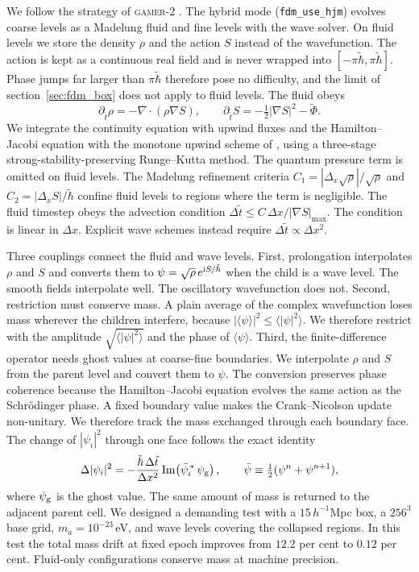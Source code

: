 \documentclass[11pt,a4paper]{article}
\newcommand{\code}[1]{\texttt{#1}}
\begin{document}
We follow the strategy of \textsc{gamer}-2
\citep{Kunkel2024,Chan2025}. The hybrid mode
(\code{fdm\_use\_hjm}) evolves coarse levels as a Madelung fluid
and fine levels with the wave solver. On fluid levels we store the
density $\rho$ and the action $S$ instead of the wavefunction. The
action is kept as a continuous real field and is never wrapped
into $[-\pi\tilde\hbar,\pi\tilde\hbar]$. Phase jumps far larger
than $\pi\tilde\hbar$ therefore pose no difficulty, and the limit
of section~\ref{sec:fdm_box} does not apply to fluid levels. The
fluid obeys
\begin{equation}
\partial_{\tilde t}\rho = -\nabla\!\cdot\!(\rho\nabla S),
\qquad
\partial_{\tilde t}S = -\tfrac12|\nabla S|^2 - \tilde\Phi.
\end{equation}
We integrate the continuity equation with upwind fluxes and the
Hamilton--Jacobi equation with the monotone upwind scheme of
\citet{OsherSethian1988}, using a three-stage
strong-stability-preserving Runge--Kutta method. The quantum
pressure term is omitted on fluid levels. The Madelung refinement
criteria $C_1=|\Delta_x\sqrt\rho|/\sqrt\rho$ and
$C_2=|\Delta_x S|/\tilde\hbar$ confine fluid levels to regions
where the term is negligible. The fluid timestep obeys the
advection condition
$\Delta\tilde t\le C\,\Delta x/|\nabla S|_{\max}$. The condition
is linear in $\Delta x$. Explicit wave schemes instead require
$\Delta\tilde t\propto\Delta x^2$.

Three couplings connect the fluid and wave levels. First,
prolongation interpolates $\rho$ and $S$ and converts them to
$\psi=\sqrt\rho\,e^{{\rm i}S/\tilde\hbar}$ when the child is a
wave level. The smooth fields interpolate well. The oscillatory
wavefunction does not. Second, restriction must conserve mass. A
plain average of the complex wavefunction loses mass wherever the
children interfere, because
$|\langle\psi\rangle|^2\le\langle|\psi|^2\rangle$. We therefore
restrict with the amplitude $\sqrt{\langle|\psi|^2\rangle}$ and
the phase of $\langle\psi\rangle$. Third, the finite-difference
operator needs ghost values at coarse-fine boundaries. We
interpolate $\rho$ and $S$ from the parent level and convert them
to $\psi$. The conversion preserves phase coherence because the
Hamilton--Jacobi equation evolves the same action as the
Schr\"odinger phase. A fixed boundary value makes the
Crank--Nicolson update non-unitary. We therefore track the mass
exchanged through each boundary face. The change of $|\psi_i|^2$
through one face follows the exact identity
\begin{equation}
\Delta|\psi_i|^2
= -\frac{\tilde\hbar\,\Delta\tilde t}{\Delta x^2}\,
{\rm Im}\!\left(\bar\psi_i^{\,*}\,\psi_{\rm g}\right),
\qquad \bar\psi \equiv \tfrac12(\psi^{n}+\psi^{n+1}),
\label{eq:fdm_flux}
\end{equation}
where $\psi_{\rm g}$ is the ghost value. The same amount of mass
is returned to the adjacent parent cell. We designed a demanding
test with a $15\,h^{-1}$Mpc box, a $256^3$ base grid,
$m_a=10^{-23}$\,eV, and wave levels covering the collapsed
regions. In this test the total mass drift at fixed epoch improves
from $12.2$ per cent to $0.12$ per cent. Fluid-only configurations
conserve mass at machine precision.
\end{document}
